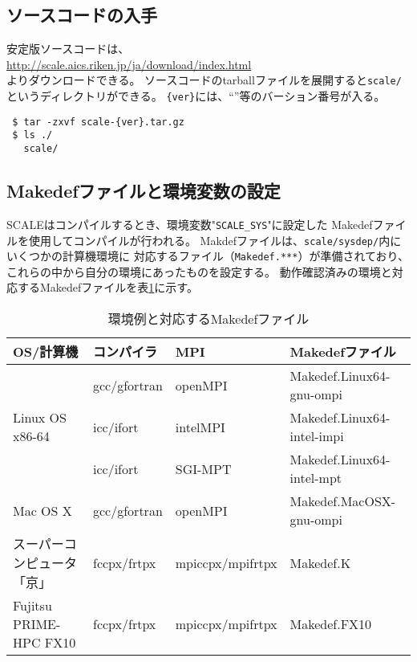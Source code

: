 \subsection{ソースコードの入手}
安定版ソースコードは、\\
 \url{http://scale.aics.riken.jp/ja/download/index.html}\\
よりダウンロードできる。
ソースコードのtarballファイルを展開すると\verb|scale/|というディレクトリができる。
\verb|{ver}|には、``\version''等のバーション番号が入る。
\begin{verbatim}
 $ tar -zxvf scale-{ver}.tar.gz
 $ ls ./
   scale/
\end{verbatim}



\subsection{Makedefファイルと環境変数の設定}

SCALEはコンパイルするとき、環境変数"\verb|SCALE_SYS|"に設定した
Makedefファイルを使用してコンパイルが行われる。
Makdefファイルは、\verb|scale/sysdep/|内にいくつかの計算機環境に
対応するファイル（\verb|Makedef.***|）が準備されており、
これらの中から自分の環境にあったものを設定する。
動作確認済みの環境と対応するMakedefファイルを表\ref{tab:makedef}に示す。

\begin{table}[htb]
\begin{center}
\caption{環境例と対応するMakedefファイル}
\begin{tabularx}{150mm}{|l|l|X|l|} \hline
 \rowcolor[gray]{0.9} OS/計算機 & コンパイラ & MPI & Makedefファイル \\ \hline
              & gcc/gfortran & openMPI & Makedef.Linux64-gnu-ompi \\ \cline{2-4}
 Linux OS x86-64 & icc/ifort & intelMPI & Makedef.Linux64-intel-impi \\ \cline{2-4}
              & icc/ifort    & SGI-MPT & Makedef.Linux64-intel-mpt \\ \hline
 Mac OS X     & gcc/gfortran & openMPI & Makedef.MacOSX-gnu-ompi \\ \hline
 スーパーコンピュータ「京」 & fccpx/frtpx & mpiccpx/mpifrtpx & Makedef.K \\ \hline
 Fujitsu PRIME-HPC FX10   & fccpx/frtpx & mpiccpx/mpifrtpx & Makedef.FX10 \\ \hline
\end{tabularx}
\label{tab:makedef}
\end{center}
\end{table}




